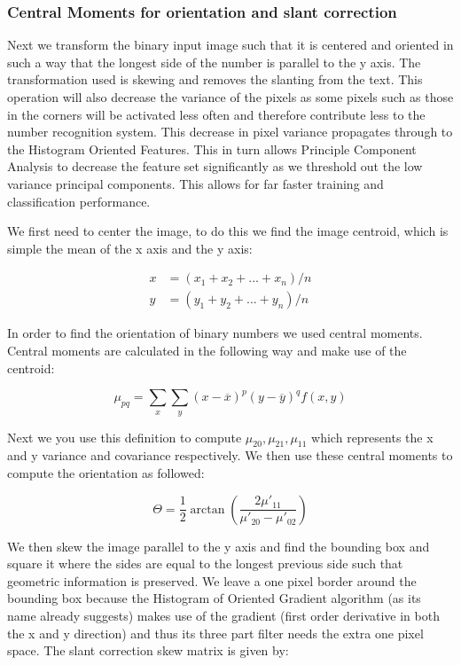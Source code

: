 \documentclass[%
        compressed,
        final,
        notitlepage,
        narroweqnarray,
        inline,
        twoside,
        ]{ieee}
\begin{document}
\subsubsection{Central Moments for orientation and slant correction}
Next we transform the binary input image such that it is centered and oriented in such a way that the longest side of the number is parallel to the y axis. The transformation used is skewing and removes the slanting from the text. This operation will also decrease the variance of the pixels as some pixels such as those in the corners will be activated less often and therefore contribute less to the number recognition system. This decrease in pixel variance propagates through to the Histogram Oriented Features. This in turn allows Principle Component Analysis to decrease the feature set significantly as we threshold out the low variance principal components. This allows for far faster training and classification performance.

We first need to center the image, to do this we find the image centroid, which is simple the mean of the x axis and the y axis:

\begin{align}
    x&=(x_1+x_2+...+x_n)/n \\
    y&=(y_1+y_2+...+y_n)/n
\end{align}

In order to find the orientation of binary numbers we used central moments. Central moments are calculated in the following way and make use of the centroid:

\begin{equation}
    \mu_{pq} = \sum_x \sum_y (x - \overline{x})^p(y - \overline{y})^q f(x, y)
\end{equation}

 
Next we you use this definition to compute $\mu_{20}, \mu_{21}, \mu_{11}$ which represents the x and y variance and covariance respectively. We then use these central moments to compute the orientation as followed:

\begin{equation}
    \Theta = \frac{1}{2} \arctan \left(
        \frac{2\mu'_{11}}{\mu'_{20} - \mu'_{02}}
    \right)
\end{equation}

We then skew the image parallel to the y axis and find the bounding box and square it where the sides are equal to the longest previous side such that geometric information is preserved. We leave a one pixel border around the bounding box because the Histogram of Oriented Gradient algorithm (as its name already suggests) makes use of the gradient (first order derivative in both the x and y direction) and thus its three part filter needs the extra one pixel space. The slant correction skew matrix is given by:
\end{document}
